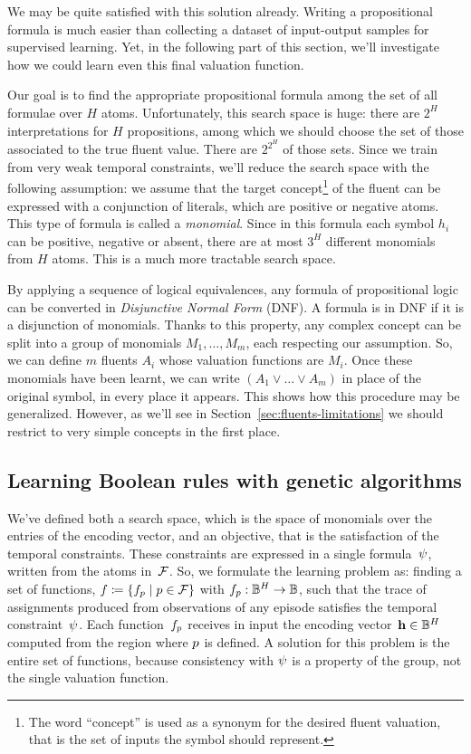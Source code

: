 We may be quite satisfied with this solution already. Writing a propositional
formula is much easier than collecting a dataset of input-output samples for
supervised learning. Yet, in the following part of this section, we'll
investigate how we could learn even this final valuation function.

Our goal is to find the appropriate propositional formula among the set of all
formulae over $H$ atoms. Unfortunately, this search space is huge: there are
$2^H$ interpretations for $H$ propositions, among which we should choose the
set of those associated to the true fluent value. There are $2^{2^H}$ of those
sets. Since we train from very weak temporal constraints, we'll reduce the
search space with the following assumption: we assume that the target
concept\footnote{The word ``concept'' is used as a synonym for the desired
fluent valuation, that is the set of inputs the symbol should represent.} of
the fluent can be expressed with a conjunction of literals, which are positive
or negative atoms. This type of formula is called a \emph{monomial}. Since in
this formula each symbol $h_i$ can be positive, negative or absent, there are
at most $3^H$ different monomials from $H$ atoms. This is a much more
tractable search space.

By applying a sequence of logical equivalences, any formula of propositional
logic can be converted in \emph{Disjunctive Normal Form}
(DNF). A formula is in DNF if it is
a disjunction of monomials. Thanks to this property, any complex concept can
be split into a group of monomials $M_1, \dots, M_m$, each respecting our
assumption. So, we can define $m$ fluents $A_i$ whose valuation functions are
$M_i$. Once these monomials have been learnt, we can write $(A_1 \lor \dots
\lor A_m)$ in place of the original symbol, in every place it appears. This
shows how this procedure may be generalized. However, as we'll see in
Section~\ref{sec:fluents-limitations} we should restrict to very simple
concepts in the first place.


\subsection{Learning Boolean rules with genetic algorithms}

We've defined both a search space, which is the space of monomials over the
entries of the encoding vector, and an objective, that is the satisfaction of
the temporal constraints. These constraints are expressed in a single \ldl{}
formula~$\psi$, written from the atoms in~$\mathcal{F}$. So, we formulate
the learning problem as: finding a set of functions, $f \coloneqq
\{f_p \mid p \in \mathcal{F}\}$ with $f_p: \mathbb{B}^H \to \mathbb{B}$,
such that the trace of assignments produced from observations of any episode
satisfies the temporal constraint~$\psi$. Each function~$f_p$
receives in input the encoding vector~$\mathbf{h} \in \mathbb{B}^H$ computed from the region
where $p$ is defined. A solution for this problem is the entire set of
functions, because consistency with $\psi$ is a property of the group,
not the single valuation function.

